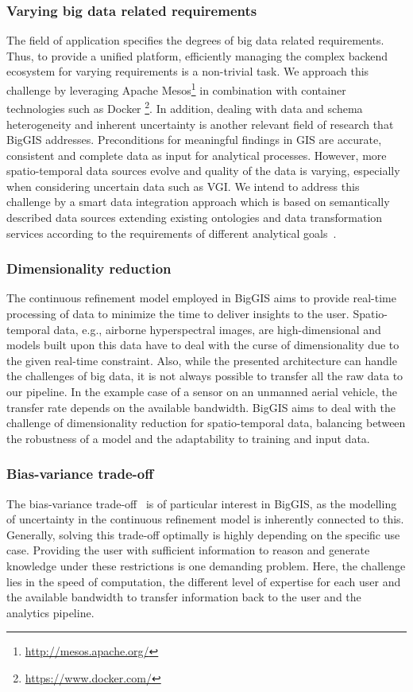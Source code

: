 \documentclass{sig-alternate-05-2015}
\begin{document}
\subsubsection{Varying big data related requirements}
The field of application specifies the degrees of big data related
requirements. Thus, to provide a unified platform, efficiently managing
the complex backend ecosystem for varying requirements is a non-trivial task.
We approach this challenge by leveraging Apache
Mesos\footnote{\url{http://mesos.apache.org/}} in combination with container
technologies such as Docker \footnote{\url{https://www.docker.com/}}. In
addition, dealing with data and schema heterogeneity and inherent uncertainty
is another relevant field of research that BigGIS addresses. Preconditions for
meaningful findings in GIS are accurate, consistent and complete data as input
for analytical processes. However, more spatio-temporal data sources evolve and
quality of the data is varying, especially when considering uncertain data such
as VGI. We intend to address this challenge by a smart data integration
approach which is based on semantically described data sources extending
existing ontologies and data transformation services according to the
requirements of different analytical goals~\cite{Frank.2016a, Frank.2016b}.

\subsubsection{Dimensionality reduction}
The continuous refinement model employed in BigGIS aims to provide real-time
processing of data to minimize the time to deliver insights to the user.
Spatio-temporal data, e.g., airborne hyperspectral images, are high-dimensional
and models built upon this data have to deal with the curse of dimensionality
due to the given real-time constraint. Also, while the presented architecture
can handle the challenges of big data, it is not always possible to transfer
all the raw data to our pipeline. In the example case of a sensor on an
unmanned aerial vehicle, the transfer rate depends on the available bandwidth.
BigGIS aims to deal with the challenge of dimensionality reduction for
spatio-temporal data, balancing between the robustness of a model and the
adaptability to training and input data. 

\subsubsection{Bias-variance trade-off}
The bias-variance trade-off~\cite{Hastie2009} is of particular
interest in BigGIS, as the modelling of uncertainty in the continuous
refinement model is inherently connected to this. Generally, solving this
trade-off optimally is highly depending on the specific use case. Providing the
user with sufficient information to reason and generate knowledge under these
restrictions is one demanding problem. Here, the challenge lies in the speed
of computation, the different level of expertise for each user and the
available bandwidth to transfer information back to the user and the analytics
pipeline.
\end{document}
